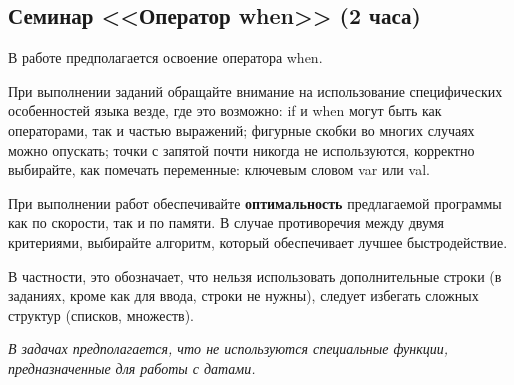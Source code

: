 \subsection{Семинар <<Оператор when>> (2 часа)}



В работе предполагается освоение оператора when.

При выполнении заданий обращайте внимание на использование специфических особенностей языка везде, где это возможно: 
if и when могут быть как операторами, так и частью выражений; фигурные скобки во многих случаях можно опускать;
точки с запятой почти никогда не используются, корректно выбирайте, как помечать переменные: ключевым словом var или val.

При выполнении работ обеспечивайте \textbf{оптимальность} предлагаемой программы как по скорости, так и по памяти. В
случае противоречия между двумя критериями, выбирайте алгоритм, который обеспечивает лучшее быстродействие.

В частности, это обозначает, что нельзя использовать дополнительные строки (в заданиях, кроме как для ввода, строки не нужны),
следует избегать сложных структур (списков, множеств). 

\textit {В задачах предполагается, что не используются специальные функции, предназначенные для работы с датами.}

